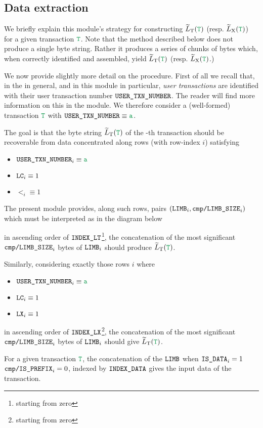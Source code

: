 \subsection{Data extraction}

We briefly explain this module's strategy for constructing $\locLtTildeOfT$ (resp. $\locLxTildeOfT$) for a given transaction $\locTransaction$.
Note that the method described below does not produce a single byte string.
Rather it produces a series of chunks of bytes which, when correctly identified and assembled, yield $\locLtTildeOfT$ (resp. $\locLxTildeOfT$.)

We now provide slightly more detail on the procedure.
First of all we recall that, in the \zkEvm{} in general, and in this module in particular,
\emph{user transactions} are identified with their user transaction number
$\texttt{USER}\texttt{\_}\texttt{TXN\_NUMBER}$.
The reader will find more information on this in the \userTxnDataMod{} module.
We therefore consider a (well-formed) transaction $\locTransaction$ with $\userTransactionNumber \equiv \loc{a}$.

The goal is that the byte string $\locLtTildeOfT$
of the -th transaction
should be recoverable from data concentrated along rows
(with row-index $i$) satisfying
\begin{multicols}{3}
	\begin{itemize}
		\item $\userTransactionNumber _{i} \equiv \loc{a}$
		\item $\texttt{LC}                    _{i} \equiv 1$
		\item $\lt                    _{i} \equiv 1$
	\end{itemize}
\end{multicols}
The present module provides, along such rows,
pairs
$(\texttt{LIMB} _{i},
\texttt{cmp}\texttt{/}\texttt{{LIMB\_SIZE}} _{i})$
which must be interpreted as in the diagram below



in ascending order of $\texttt{INDEX\_LT}$\footnote{starting from zero},
the concatenation of the most significant 
$\texttt{cmp}\texttt{/}\texttt{{LIMB\_SIZE}} _{i}$ bytes of $\texttt{LIMB} _{i}$ should produce $\locLtTildeOfT$.

Similarly, considering exactly those rows $i$ where
\begin{multicols}{3}
	\begin{itemize}
		\item $\userTransactionNumber _{i} \equiv \loc{a}$
		\item $\texttt{LC}                    _{i} \equiv 1$
		\item $\texttt{LX}                    _{i} \equiv 1$
	\end{itemize}
\end{multicols}
\noindent in ascending order of $\texttt{INDEX\_LX}$\footnote{starting from zero},
the concatenation of the most significant 
$\texttt{cmp}\texttt{/}\texttt{{LIMB\_SIZE}} _{i}$ bytes of $\texttt{LIMB} _{i}$ should give $\locLtTildeOfT$.

\saNote{} For a given transaction $\locTransaction$,
the concatenation of the
$\texttt{LIMB}$ when
$\texttt{IS\_DATA} _{i} = 1$ \et{}
$\texttt{cmp}\texttt{/}\texttt{{\texttt{IS\_PREFIX}}} _{i} = 0$, indexed by
$\texttt{INDEX\_DATA}$ gives the input data of the transaction.
